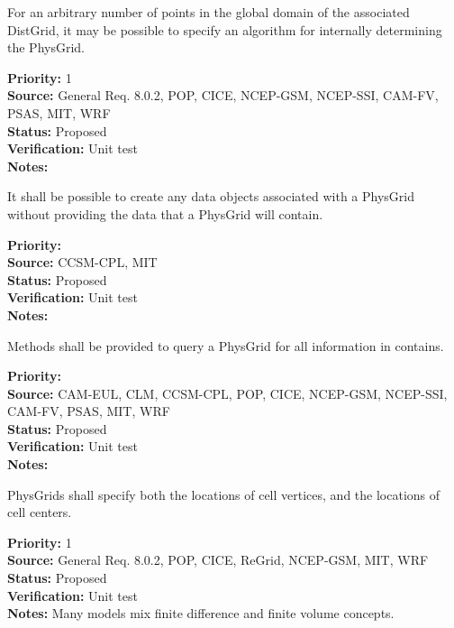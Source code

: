 For an arbitrary number of points in the global domain of the associated
DistGrid, it may be possible to specify an algorithm for internally
determining the PhysGrid.
\begin{reqlist}
{\bf Priority:} 1 \\
{\bf Source:} General Req. 8.0.2, POP, CICE, NCEP-GSM, NCEP-SSI,
              CAM-FV, PSAS, MIT, WRF \\
{\bf Status:} Proposed \\
{\bf Verification:} Unit test\\
{\bf Notes:} 
\end{reqlist}

It shall be possible to create any data objects associated with a PhysGrid without
providing the data that a PhysGrid will contain.
\begin{reqlist}
{\bf Priority:} \\
{\bf Source:} CCSM-CPL, MIT \\
{\bf Status:} Proposed \\
{\bf Verification:} Unit test\\
{\bf Notes:} 
\end{reqlist}

Methods shall be provided to query a PhysGrid for all information in contains.
\begin{reqlist}
{\bf Priority:} \\
{\bf Source:} CAM-EUL, CLM, CCSM-CPL, POP, CICE, NCEP-GSM, NCEP-SSI,
              CAM-FV, PSAS, MIT, WRF \\
{\bf Status:} Proposed \\
{\bf Verification:} Unit test\\
{\bf Notes:} 
\end{reqlist}

PhysGrids shall specify both the locations of cell vertices, and the locations
of cell centers.
\begin{reqlist}
{\bf Priority:} 1 \\
{\bf Source:} General Req. 8.0.2, POP, CICE, ReGrid, NCEP-GSM, MIT, WRF \\
{\bf Status:} Proposed \\
{\bf Verification:} Unit test\\
{\bf Notes:} Many models mix finite difference and finite volume concepts.
\end{reqlist}

